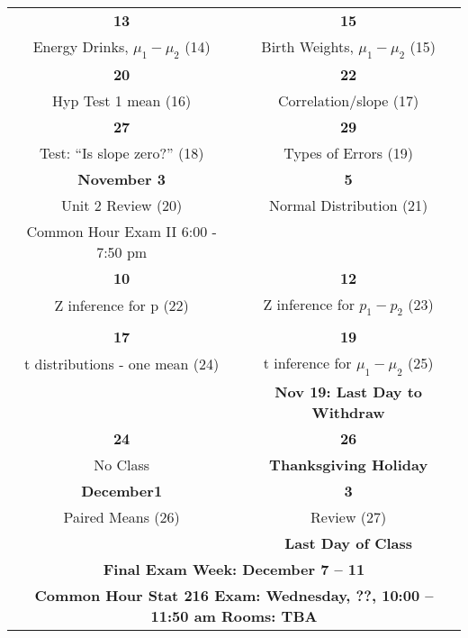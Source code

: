 \begin{center}
\begin{tabular}{|c|c|}
   \hfill\bf{13} & \hfill\bf{15} \\
 Energy Drinks, $\mu_1 - \mu_2$  \small{(14)}& 
 Birth Weights, $\mu_1 - \mu_2$ \small{(15)}  \\ 
\hline

 \hfill\bf{20}  & \hfill\bf{22} \\
Hyp Test 1 mean   \small{(16)}   &   
 Correlation/slope \small{(17)}\\ \hline

  \hfill\bf{27} & \hfill\bf{29} \\
  Test: ``Is slope zero?'' \small{(18)} &  
Types of Errors \small{(19)} %
 \\ \hline

   \bf{November} \hfill\bf{3} & \hfill\bf{5} \\
 Unit 2  Review   \small{(20)}&  
 Normal Distribution \small{(21)}  %
 \\
Common Hour Exam II 6:00 - 7:50 pm & \\
 \hline

   \hfill\bf{10} & \hfill\bf{12} \\
  Z inference for p   \small{(22)} 
 & Z inference for $p_1-p_2$  \small{(23)}
  \\
   &  \\ \hline

   \hfill\bf{17}  &  \hfill\bf{19}  \\
  t distributions - one mean  \small{(24)}&
  t inference for $\mu_1- \mu_2$  \small{(25)}\\ 
  &
   \small\bf{Nov 19: Last Day to Withdraw} \\ \hline
 
 \hfill\bf{24} & \hfill\bf{26} \\
No Class 
 & {\bf Thanksgiving Holiday} 
\\ \hline

  {\bf December}\hfill\bf{1} & \hfill\bf{3} \\
  Paired Means \small{(26)}
  & Review    \small{(27)}
\\
  &  \small\bf{ Last Day of Class}  \\ \hline

  \multicolumn{2}{|c|}{\textbf{Final Exam Week: December 7 -- 11 }} \\
  \multicolumn{2}{|c|}{\bf{ Common Hour Stat 216  Exam: 
      Wednesday, ??, 10:00 -- 11:50 am Rooms: TBA}} \\
\hline

\end{tabular}
\vspace{.2in} \\
\end{center}
%  
